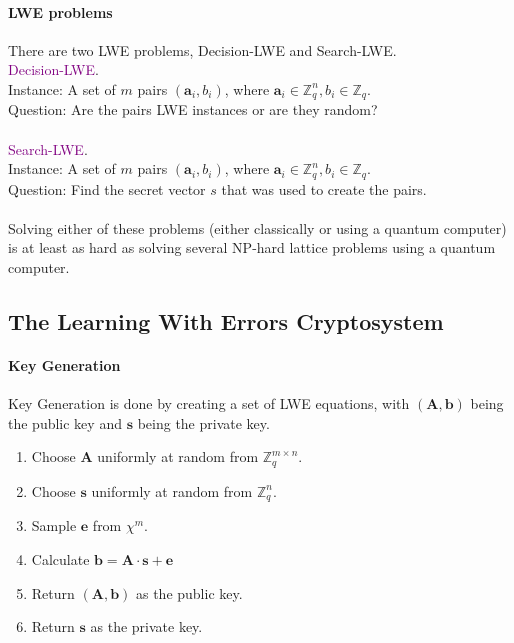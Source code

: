 \documentclass[a4paper, 11pt, openany]{book}
\numberwithin{equation}{section}
\theoremstyle{plain}
\theoremstyle{definition}
\newcommand{\Define}[1]{\textcolor{purple}{#1}}
\begin{document}
\paragraph{LWE problems} There are two LWE problems, Decision-LWE and Search-LWE.
\\
\Define{Decision-LWE}.
\\
Instance: A set of $m$ pairs $(\textbf{a}_{i},b_{i})$, where $\textbf{a}_{i} \in \mathbb{Z}_{q}^{n}, b_{i} \in \mathbb{Z}_{q}$.
\\
Question: Are the pairs LWE instances or are they random?
\\
~\\
\Define{Search-LWE}.
\\
Instance: A set of $m$ pairs $(\textbf{a}_{i},b_{i})$, where $\textbf{a}_{i} \in \mathbb{Z}_{q}^{n}, b_{i} \in \mathbb{Z}_{q}$.
\\
Question: Find the secret vector $s$ that was used to create the pairs. 
\\
~\\
Solving either of these problems (either classically or using a quantum computer) is at least as hard as solving several NP-hard lattice problems using a quantum computer.

\subsection{The Learning With Errors Cryptosystem}
\paragraph{Key Generation} Key Generation is done by creating a set of LWE equations, with $(\textbf{A},\textbf{b})$ being the public key and $\textbf{s}$ being the private key.
\\
\begin{enumerate}
	\item Choose $\textbf{A}$ uniformly at random from $\mathbb{Z}^{m\times n}_{q}$.
	\item Choose $\textbf{s}$ uniformly at random from $\mathbb{Z}^{n}_{q}$.
	\item Sample $\textbf{e}$ from $\chi^{m}$.
	\item Calculate $\textbf{b} = \textbf{A}\cdot \textbf{s}+\textbf{e}$
	\item Return $(\textbf{A},\textbf{b})$ as the public key.
	\item Return $\textbf{s}$ as the private key.
\end{enumerate}
\end{document}
